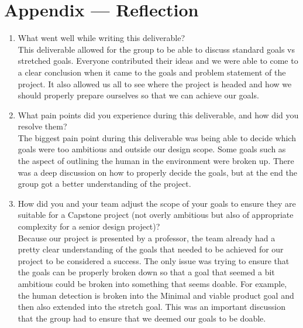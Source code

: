 \documentclass{article}
\begin{document}
\newpage{}

\section*{Appendix --- Reflection}
    \begin{enumerate}
        \item What went well while writing this deliverable? \\

This deliverable allowed for the group to be able to discuss standard goals vs stretched goals. Everyone contributed their ideas and we were able to come to a clear conclusion 
when it came to the goals and problem statement of the project. It also allowed us all to see where the project is headed and how we should properly prepare
 ourselves so that we can achieve our goals. 

\item What pain points did you experience during this deliverable, and how
did you resolve them?\\

The biggest pain point during this deliverable was being able to decide which goals were too ambitious and outside our design scope. Some goals such as the aspect of outlining the human 
in the environment were broken up. There was a deep discussion on how to properly decide the goals, but at the end the  group got a better understanding of the project.

\item How did you and your team adjust the scope of your goals to ensure
they are suitable for a Capstone project (not overly ambitious but also of
appropriate complexity for a senior design project)?\\

Because our project is presented by a professor, the team already had a pretty clear understanding of the goals that needed to be achieved for our project to be considered a success.
 The only issue was trying to ensure that the goals can be properly broken down so that a goal that seemed a bit ambitious could be broken into something that seems doable. For example, 
 the human detection is broken into the Minimal and viable product goal and then also extended into the stretch goal. This was an important discussion that the group had to ensure that we 
 deemed our goals to be doable.

    \end{enumerate}
\end{document}
